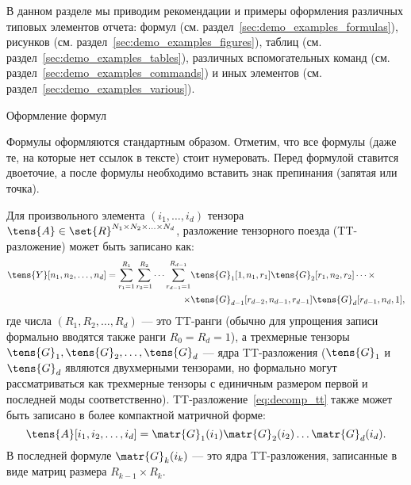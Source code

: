 
В данном разделе мы приводим рекомендации и примеры оформления различных типовых элементов отчета: формул (см. раздел~\ref{sec:demo_examples_formulas}), рисунков (см. раздел~\ref{sec:demo_examples_figures}), таблиц (см. раздел~\ref{sec:demo_examples_tables}), различных вспомогательных команд (см. раздел~\ref{sec:demo_examples_commands}) и иных элементов (см. раздел~\ref{sec:demo_examples_various}).

  {Оформление формул}

  Формулы оформляются стандартным образом.
  Отметим, что все формулы (даже те, на которые нет ссылок в тексте) стоит нумеровать.
  Перед формулой ставится двоеточие, а после формулы необходимо вставить знак препинания (запятая или точка).

  Для произвольного элемента $(i_1,\ldots,i_d)$ тензора $\tens{A} \in \set{R}^{N_1 \times N_2 \times \ldots \times N_d}$, разложение тензорного поезда (TT-разложение) может быть записано как:
  \begin{equation}\label{eq:decomp_tt}
    \begin{split}
      \tens{Y} [n_1, n_2, \ldots, n_d] =
        \sum_{r_1=1}^{R_1}
        \sum_{r_2=1}^{R_2}
        \cdots
        \sum_{r_{d-1}=1}^{R_{d-1}}
          &
          \tens{G}_1 [1, n_1, r_1]
          \tens{G}_2 [r_1, n_2, r_2]
          \cdots \times
          \\
          \times
          &
          \tens{G}_{d-1} [r_{d-2}, n_{d-1}, r_{d-1}]
          \tens{G}_d [r_{d-1}, n_d, 1],
    \end{split}
  \end{equation}
  где числа $(R_1, R_2, \ldots, R_d)$ --- это TT-ранги (обычно для упрощения записи формально вводятся также ранги $R_0=R_d=1$), а трехмерные тензоры $\tens{G}_1, \tens{G}_2, \ldots, \tens{G}_d$ --- ядра TT-разложения ($\tens{G}_1$ и $\tens{G}_d$ являются двухмерными тензорами, но формально могут рассматриваться как трехмерные тензоры с единичным размером первой и последней моды соответственно).
  TT-разложение~\eqref{eq:decomp_tt} также может быть записано в более компактной матричной форме:
  \begin{equation}
  	\tens{A}[i_1, i_2, \ldots, i_d]
  	=
  	\matr{G}_1(i_1)
  	\matr{G}_2(i_2)
  	\ldots
  	\matr{G}_d(i_d).
  \end{equation}
  В последней формуле $\matr{G}_k(i_k)$ --- это ядра TT-разложения, записанные в виде матриц размера $R_{k-1} \times R_k$.

